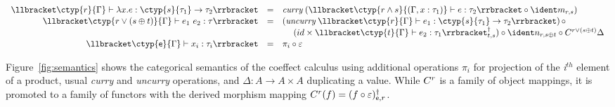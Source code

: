 \begin{figure*}[t]
\vspace{-1em}
\newcommand{\uu}[1]{\overline{#1}}
\begin{equation*}
\begin{array}{rcll}
\cosem{\ctyp{r}{\Gamma} \vdash \lambda x.e : \ctyp{s}{\tau_1} \rightarrow \tau_2} &=& 
    \emph{curry} \; (\cosem{\ctyp{r \wedge s}{(\Gamma, x:\tau_1)} \vdash e : \tau_2} \circ \cmerge_{r, s})    %
\\[0.1em]
\cosem{\ctyp{r \vee (s \imult t)}{\Gamma} \vdash e_1~e_2 : \tau} &=& 
    (\emph{uncurry} \;  \cosem{\ctyp{r}{\Gamma} \vdash e_1 : \ctyp{s}{\tau_1} \rightarrow \tau_2}) \, \circ \\
 & & \quad\; (id \times \cobind{\cosem{\ctyp{t}{\Gamma}\vdash e_2 : \tau_1}}{t,s})
    \circ \csplit_{r, s \imult t} \circ \iftor{r \vee (s \imult t)}\Delta
\\[0.1em]
\cosem{\ctyp{\iunit}{\Gamma} \vdash x_i : \tau_i} &=&
    \pi_i \circ \counit                                                                  %
\end{array}
\end{equation*}
\vspace{-1.5em}
\caption{Categorical semantics for the coeffect calculus}
\label{fig:semantics}
\vspace{-1.0em}
\end{figure*}

Figure~\ref{fig:semantics} shows the
categorical semantics of the coeffect calculus
using additional operations 
$\pi_i$ for projection of the \emph{i}$^{th}$ element of a 
product, usual
\emph{curry} and \emph{uncurry} operations, and
 $\Delta : A \rightarrow A \times A$ duplicating a
value. While $C^{r}$ is a family of object mappings,
it is promoted to a family of functors with the derived morphism mapping 
$C^{r}(f) = (f \circ \varepsilon) ^\dagger_{\mathsf{e}, r}$.

